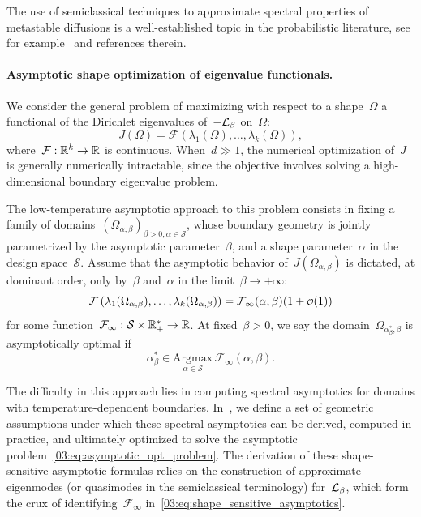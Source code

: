     The use of semiclassical techniques to approximate spectral properties of metastable diffusions is a well-established topic in the probabilistic literature, see for example~\cite{HS85,BGK05,HN04,LN15,DGLLPN19,DGLLPN20,LPN21,LRS24,BLS25a} and references therein.
    \paragraph{Asymptotic shape optimization of eigenvalue functionals.}
    We consider the general problem of maximizing with respect to a shape~$\Omega$ a functional of the Dirichlet eigenvalues of~$-\mathcal{L}_\beta$ on~$\Omega$:
    \begin{equation}
        \label{03:eq:shape_functional}
        J(\Omega) = \mathcal F(\lambda_{1}(\Omega),\dots,\lambda_{k}(\Omega)),
    \end{equation}
    where~$\mathcal F:\mathbb{R}^k\to\mathbb{R}$ is continuous. When~$d\gg 1$, the numerical optimization of~$J$ is generally numerically intractable, since the objective involves solving a high-dimensional boundary eigenvalue problem. 

    The low-temperature asymptotic approach to this problem consists in fixing a family of domains~$(\Omega_{\alpha,\beta})_{\beta>0,\alpha\in\mathcal S}$, whose boundary geometry is jointly parametrized by the asymptotic parameter~$\beta$, and a shape parameter~$\alpha$ in the design space~$\mathcal S$.
    Assume that the asymptotic behavior of~$J(\Omega_{\alpha,\beta})$ is dictated, at dominant order, only by~$\beta$ and~$\alpha$ in the limit~$\beta\to+\infty$:
            \begin{equation}
                \label{03:eq:shape_sensitive_asymptotics}
            \mathcal F\left(\lambda_1(\Omega_{\alpha,\beta}),\dots,\lambda_k(\Omega_{\alpha,\beta})\right)=\mathcal F_{\infty}(\alpha,\beta)(1+\smallo(1))
        \end{equation}
        for some function~$\mathcal F_\infty:\mathcal S \times \mathbb{R}_+^*\to \mathbb{R}$.
    At fixed~$\beta>0$, we say the domain~$\Omega_{\alpha^*_\beta,\beta}$ is asymptotically optimal if
    \begin{equation}
        \label{03:eq:asymptotic_opt_problem}
        \alpha^*_\beta \in \underset{\alpha \in \mathcal S}{\mathrm{Argmax}}\, \mathcal F_\infty(\alpha,\beta).
    \end{equation}

    The difficulty in this approach lies in computing spectral asymptotics for domains with temperature-dependent boundaries.
    In~\cite{BLS25a}, we define a set of geometric assumptions under which these spectral asymptotics can be derived, computed in practice, and ultimately optimized to solve the asymptotic problem~\eqref{03:eq:asymptotic_opt_problem}.
    The derivation of these shape-sensitive asymptotic formulas relies on the construction of approximate eigenmodes (or quasimodes in the semiclassical terminology) for~$\mathcal{L}_\beta$, which form the crux of identifying~$\mathcal F_\infty$ in~\eqref{03:eq:shape_sensitive_asymptotics}.

